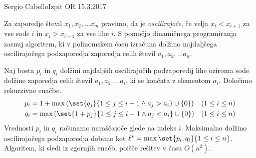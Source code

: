 \begin{naloga}{Sergio Cabello}{Izpit OR 15.3.2017}
\begin{vprasanje}
Za zaporedje števil $x_1, x_2, \dots x_m$ pravimo, da je {\em oscilirajoče},
če velja $x_i < x_{i+1}$ za vse sode $i$ in $x_i > x_{i+1}$ za vse lihe $i$.
S pomočjo dinamičnega programiranja zasnuj algoritem,
ki v polinomskem času izračuna dolžino najdaljšega oscilirajočega podzaporedja
zaporedja celih števil $a_1, a_2, \dots a_n$.
\end{vprasanje}

\begin{odgovor}
Naj bosta $p_i$ in $q_i$ dolžini najdaljših oscilirajočih podzaporedij
lihe oziroma sode dolžine zaporedja celih števil $a_1, a_2, \dots a_i$,
ki se končata z elementom $a_i$.
Določimo rekurzivne enačbe.
\begin{align*}
p_i &= 1 + \max\left(\set{q_j}{1 \le j \le i-1 \land a_j > a_i} \cup \{0\}\right)
& (1 \le i \le n) \\
q_i &= \max\left(\set{1 + p_j}{1 \le j \le i-1 \land a_j < a_i} \cup \{0\}\right)
& (1 \le i \le n)
\end{align*}
Vrednosti $p_i$ in $q_i$ računamo naraščajoče glede na indeks $i$.
Maksimalno dolžino oscilirajočega podzaporedja dobimo kot
$\ell^* = \max\set{p_i, q_i}{1 \le i \le n}$.
Algoritem, ki sledi iz zgornjih enačb, poišče rešitev v času $O(n^2)$.


\end{odgovor}
\end{naloga}
